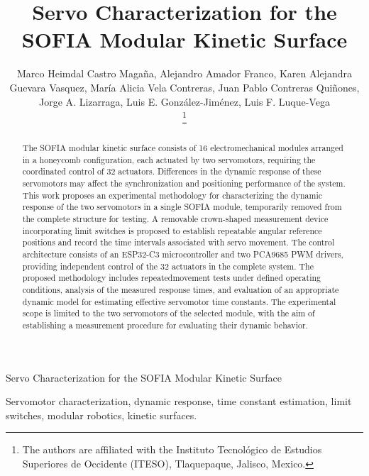 \documentclass[lettersize,journal]{IEEEtran}
\begin{document}
	\title{Servo Characterization for the SOFIA Modular Kinetic
		Surface}
	
	\author{
		Marco Heimdal Castro Magaña, Alejandro Amador Franco, Karen Alejandra Guevara Vasquez, María Alicia Vela Contreras, Juan Pablo Contreras Quiñones,
		Jorge A. Lizarraga, Luis E. González-Jiménez, Luis F. Luque-Vega
		
		\thanks{The authors are affiliated with the Instituto Tecnológico de Estudios Superiores de Occidente (ITESO), Tlaquepaque, Jalisco, Mexico.}
	}
	
	
	{Servo Characterization for the SOFIA Modular Kinetic
		Surface}
	
	\maketitle
	
	
	\begin{abstract}
		The SOFIA modular kinetic surface consists of 16 electromechanical modules arranged in a honeycomb configuration, each actuated by two servomotors, requiring the coordinated control of 32 actuators. Differences in the dynamic response of these servomotors may affect the synchronization and positioning performance of the system. This work proposes an experimental methodology for characterizing the dynamic response of the two servomotors in a single SOFIA module, temporarily removed from the complete structure for testing. A removable crown-shaped measurement device incorporating limit switches is proposed to establish repeatable angular reference positions and record the time intervals associated with servo movement. The control architecture consists of an ESP32-C3 microcontroller and two PCA9685 PWM drivers, providing independent control of the 32 actuators in the complete system. The proposed methodology includes repeatedmovement tests under defined operating conditions, analysis of the measured response times, and evaluation of an appropriate dynamic model for
		estimating effective servomotor time constants. The experimental scope is limited to the two servomotors of the selected module, with the aim of establishing a measurement procedure for evaluating their dynamic behavior.
	\end{abstract}
	
	\begin{IEEEkeywords}
		Servomotor characterization, dynamic response, time constant estimation, limit switches, modular robotics, kinetic surfaces.
	\end{IEEEkeywords}
	
\end{document}
